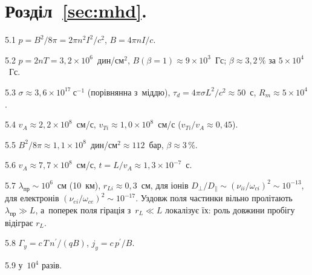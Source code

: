 \protect \section *{Розділ~\ref *{sec:mhd}. }
\begin{Solution}{5.{1}}
		$p=B^2/8\pi=2\pi n^2I^2/c^2$, $B=4\pi nI/c$.
	
\end{Solution}
\begin{Solution}{5.{2}}
		$p=2nT=3{,}2\times10^{6}$~дин/см$^2$, $B(\beta=1)\approx9\times10^{3}$~Гс; $\beta\approx3{,}2\,\%$ за $5\times10^4$~Гс.
	
\end{Solution}
\begin{Solution}{5.{3}}
		$\sigma\approx3{,}6\times10^{17}~\mathrm{с}^{-1}$ (порівнянна з~міддю), $\tau_d=4\pi\sigma L^2/c^2\approx50$~с, $R_m\approx5\times10^4$.
	
\end{Solution}
\begin{Solution}{5.{4}}
		$v_A\approx2{,}2\times10^{8}$~см/с, $v_{Ti}\approx1{,}0\times10^{8}$~см/с ($v_{Ti}/v_A\approx0{,}45$).
	
\end{Solution}
\begin{Solution}{5.{5}}
		$B^2/8\pi\approx1{,}1\times10^{8}$~дин/см$^2\approx112$~бар, $\beta\approx3\,\%$.
	
\end{Solution}
\begin{Solution}{5.{6}}
		$v_A\approx7{,}7\times10^{8}$~см/с, $t=L/v_A\approx1{,}3\times10^{-7}$~с.
	
\end{Solution}
\begin{Solution}{5.{7}}
		$\lambda_{\mathrm{пр}}\sim10^{6}$~см (10~км), $r_{Li}\approx0{,}3$~см, для іонів $D_\perp/D_\parallel\sim(\nu_{ii}/\omega_{ci})^2\sim10^{-13}$, для електронів $(\nu_{ei}/\omega_{ce})^2\sim10^{-17}$.
	Уздовж поля частинки вільно пролітають $\lambda_{\mathrm{пр}}\gg L$, а~поперек поля гірація з~$r_L\ll L$ локалізує їх: роль довжини пробігу відіграє $r_L$.
	
\end{Solution}
\begin{Solution}{5.{8}}
		$\Gamma_y=c\,T\,n^\prime/(qB)$, $j_y=c\,p^\prime/B$.
	
\end{Solution}
\begin{Solution}{5.{9}}
		у~$10^4$ разів.
	
\end{Solution}

